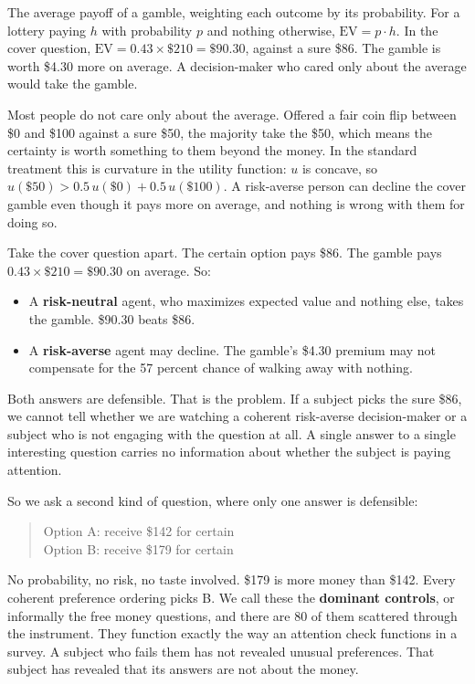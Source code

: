 \documentclass[11pt]{article}
\newcommand{\term}[1]{\textbf{\color{purpledk}#1}}
\begin{document}
\begin{keybox}
The average payoff of a gamble, weighting each outcome by its probability. For a lottery paying
$h$ with probability $p$ and nothing otherwise, $\mathrm{EV} = p \cdot h$. In the cover question,
$\mathrm{EV} = 0.43 \times \$210 = \$90.30$, against a sure \$86. The gamble is worth \$4.30 more
on average. A decision-maker who cared only about the average would take the gamble.
\end{keybox}

\begin{keybox}
Most people do not care only about the average. Offered a fair coin flip between \$0 and \$100
against a sure \$50, the majority take the \$50, which means the certainty is worth something to
them beyond the money. In the standard treatment this is curvature in the utility function:
$u$ is concave, so $u(\$50) > 0.5\,u(\$0) + 0.5\,u(\$100)$. A risk-averse person can decline the
cover gamble even though it pays more on average, and nothing is wrong with them for doing so.
\end{keybox}

\begin{workbox}
Take the cover question apart. The certain option pays \$86. The gamble pays $0.43 \times \$210 =
\$90.30$ on average. So:

\begin{itemize}
  \item A \term{risk-neutral} agent, who maximizes expected value and nothing else, takes the
  gamble. \$90.30 beats \$86.
  \item A \term{risk-averse} agent may decline. The gamble's \$4.30 premium may not compensate
  for the 57 percent chance of walking away with nothing.
\end{itemize}

Both answers are defensible. That is the problem. If a subject picks the sure \$86, we cannot
tell whether we are watching a coherent risk-averse decision-maker or a subject who is not
engaging with the question at all. A single answer to a single interesting question carries no
information about whether the subject is paying attention.

So we ask a second kind of question, where only one answer is defensible:

\begin{quote}\ttfamily\footnotesize
Option A: receive \$142 for certain\\
Option B: receive \$179 for certain
\end{quote}

No probability, no risk, no taste involved. \$179 is more money than \$142. Every coherent
preference ordering picks B. We call these the \term{dominant controls}, or informally the free
money questions, and there are 80 of them scattered through the instrument. They function
exactly the way an attention check functions in a survey. A subject who fails them has not
revealed unusual preferences. That subject has revealed that its answers are not about the
money.
\end{workbox}
\end{document}
